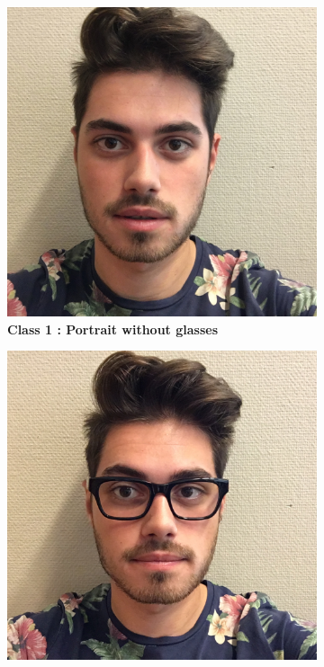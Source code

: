\begin{figure}[!hp]
\centering
	\begin{subfigure}[t]{0.18\textwidth}
    \centering
	\includegraphics[height=0.05\textheight]{dataset/IMG_0992.jpg}
	\captionsetup{font=small}
	\caption{\bf Class 1 : Portrait without glasses}
	\label{fig:figure1_1}
	\end{subfigure}
    \begin{subfigure}[t]{0.18\textwidth}
    \centering
    \includegraphics[height=0.05\textheight]{dataset/IMG_1077.jpg}

\end{subfigure}
\end{figure}
